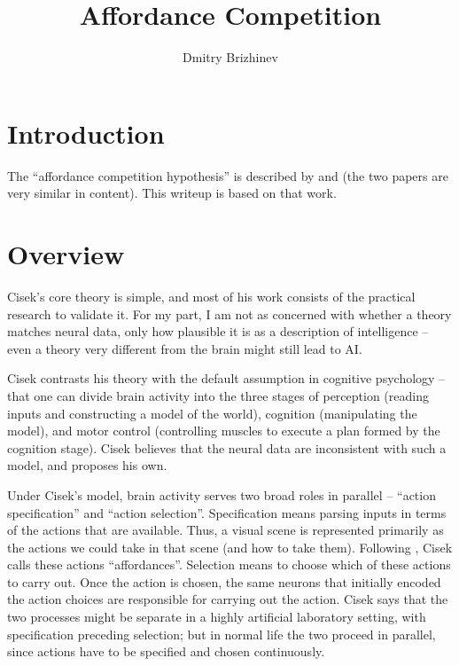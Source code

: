 \documentclass[10pt,a4paper]{article}
\newcommand{\nquote}[1]{``{#1}''}
\begin{document}
\title{\vspace{-10ex}Affordance Competition}
\author{Dmitry Brizhinev}
\maketitle

\section{Introduction}
The \nquote{affordance competition hypothesis} is described by \cite{cisek2007} and \cite{cisek2010} (the two papers are very similar in content). This writeup is based on that work.

\section{Overview}
Cisek's core theory is simple, and most of his work consists of the practical research to validate it. For my part, I am not as concerned with whether a theory matches neural data, only how plausible it is as a description of intelligence -- even a theory very different from the brain might still lead to AI.

Cisek contrasts his theory with the default assumption in cognitive psychology -- that one can divide brain activity into the three stages of perception (reading inputs and constructing a model of the world), cognition (manipulating the model), and motor control (controlling muscles to execute a plan formed by the cognition stage). Cisek believes that the neural data are inconsistent with such a model, and proposes his own.

Under Cisek's model, brain activity serves two broad roles in parallel -- \nquote{action specification} and \nquote{action selection}. Specification means parsing inputs in terms of the actions that are available. Thus, a visual scene is represented primarily as the actions we could take in that scene (and how to take them). Following \cite{gibson}, Cisek calls these actions \nquote{affordances}. Selection means to choose which of these actions to carry out. Once the action is chosen, the same neurons that initially encoded the action choices are responsible for carrying out the action. Cisek says that the two processes might be separate in a highly artificial laboratory setting, with specification preceding selection; but in normal life the two proceed in parallel, since actions have to be specified and chosen continuously.
\end{document}
